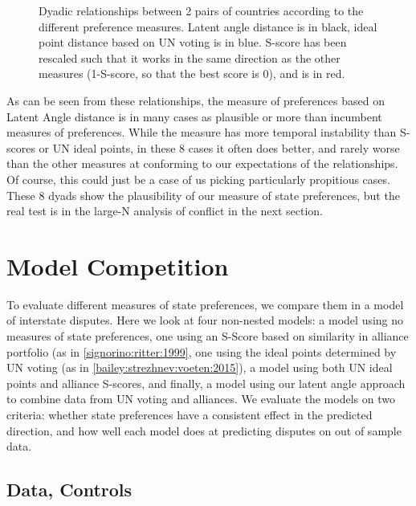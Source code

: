 \begin{figure}
\centering
{}
\caption{Dyadic relationships between 2 pairs of countries according to the different preference measures. Latent angle distance is in black, ideal point distance based on UN voting is in blue. S-score has been rescaled such that it works in the same direction as the other measures (1-S-score, so that the best score is 0), and is in red.}
\label{missing:dyads}
\end{figure}

As can be seen from these relationships, the measure of preferences based on Latent Angle distance is in many cases as plausible or more than incumbent measures of preferences. While the measure has more temporal instability than S-scores or UN ideal points, in these 8 cases it often does better, and rarely worse than the other measures at conforming to our expectations of the relationships. Of course, this could just be a case of us picking particularly propitious cases. These 8 dyads show the plausibility of our measure of state preferences, but the real test is in the large-N analysis of conflict in the next section.


\section{Model Competition}

To evaluate different measures of state preferences, we compare them in a model of interstate disputes. Here we look at four non-nested models: a model using no measures of state preferences, one using an S-Score based on similarity in alliance portfolio (as in \ref{signorino:ritter:1999}, one using the ideal points determined by UN voting (as in \ref{bailey:strezhnev:voeten:2015}), a model using both UN ideal points and alliance S-scores, and finally, a model using our latent angle approach to combine data from UN voting and alliances. We evaluate the models on two criteria: whether state preferences have a consistent effect in the predicted direction, and how well each model does at predicting disputes on out of sample data.

\subsection{Data, Controls}

